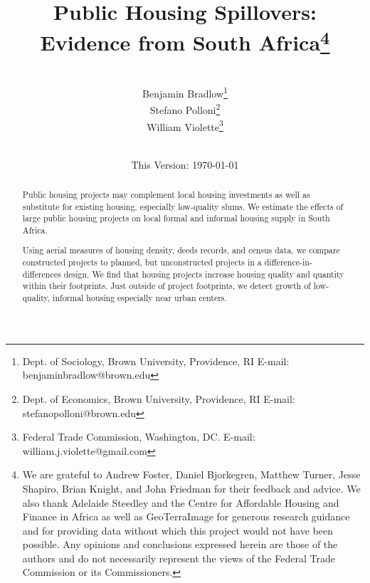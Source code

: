 \documentclass[12pt]{article}
\begin{document}
\begin{titlepage} 
\title{{Public Housing Spillovers: Evidence from South Africa}\thanks{We are grateful to Andrew Foster, Daniel Bjorkegren, Matthew Turner, Jesse Shapiro, Brian Knight, and John Friedman for their feedback and advice.  We also thank Adelaide Steedley and the Centre for Affordable Housing and Finance in Africa as well as GeoTerraImage for generous research guidance and for providing data without which this project would not have been possible.  Any opinions and conclusions expressed herein are those of the authors and do not necessarily represent the views of the Federal Trade Commission or its Commissioners.}}
\author{\\[3em] Benjamin Bradlow\thanks{Dept. of Sociology, Brown University, Providence, RI  E-mail: benjamin\textunderscore bradlow@brown.edu}\\
 Stefano Polloni\thanks{Dept. of Economics, Brown University, Providence, RI E-mail: stefano\textunderscore polloni@brown.edu}\\ 
  William Violette\thanks{Federal Trade Commission, Washington, DC. E-mail: william.j.violette@gmail.com} \\
 \\ 
  }
\vspace{30mm}
\date{\vspace{5mm}This Version: \today}
\maketitle
\begin{abstract}




	Public housing projects may complement local housing investments as well as substitute for existing housing, especially low-quality slums.  We estimate the effects of large public housing projects on local formal and informal housing supply in South Africa.  

	Using aerial measures of housing density, deeds records, and census data, we compare constructed projects to planned, but unconstructed projects in a difference-in-differences design.  We find that housing projects increase housing quality and quantity within their footprints.  Just outside of project footprints, we detect growth of low-quality, informal housing especially near urban centers. 




\end{abstract}
\end{titlepage}
\end{document}
